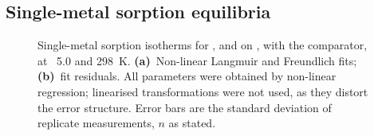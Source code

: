 

\subsection{Single-metal sorption equilibria}
\label{sec:results-isotherms}
%
%
%
%

\begin{figure}[htbp]
  \centering
  \caption[Single-metal sorption isotherms with non-linear fits]{Single-metal sorption isotherms for \PbII{}, \CuII{} and \ZnII{} on \TAOSS{}, with the \RAWOSS{} comparator, at \pH~5.0 and \SI{298}{\kelvin}. \textbf{(a)}~Non-linear Langmuir and Freundlich fits; \textbf{(b)}~fit residuals. All parameters were obtained by non-linear regression; linearised transformations were not used, as they distort the error structure. Error bars are the standard deviation of replicate measurements, $n$ as stated.}
  \label{fig:isotherms}
\end{figure}

